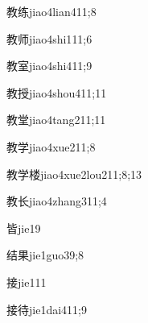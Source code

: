 \begin{verbete}{教练}{jiao4lian4}{11;8}
\end{verbete}

\begin{verbete}{教师}{jiao4shi1}{11;6}
\end{verbete}

\begin{verbete}{教室}{jiao4shi4}{11;9}
\end{verbete}

\begin{verbete}{教授}{jiao4shou4}{11;11}
\end{verbete}

\begin{verbete}{教堂}{jiao4tang2}{11;11}
\end{verbete}

\begin{verbete}{教学}{jiao4xue2}{11;8}
\end{verbete}

\begin{verbete}{教学楼}{jiao4xue2lou2}{11;8;13}
\end{verbete}

\begin{verbete}{教长}{jiao4zhang3}{11;4}
\end{verbete}

\begin{verbete}{皆}{jie1}{9}
\end{verbete}

\begin{verbete}{结果}{jie1guo3}{9;8}
\end{verbete}

\begin{verbete}{接}{jie1}{11}
\end{verbete}

\begin{verbete}{接待}{jie1dai4}{11;9}
\end{verbete}

